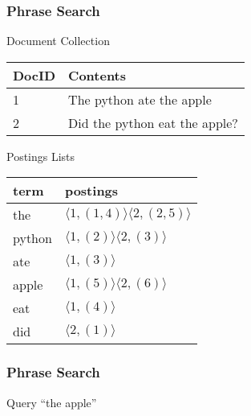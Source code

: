 \documentclass{beamer}
\begin{document}
\begin{frame}
  \frametitle{Phrase Search}

    \begin{block}{Document Collection}

    \begin{tabular}{ l | l }
      DocID & Contents \\ \hline
      1 & The python ate the apple \\
      2 & Did the python eat the apple? \\
    \end{tabular}

  \end{block}

  \begin{block}{Postings Lists}
    \begin{tabular}{ l | l }
      term & postings \\ \hline
      the & $ \langle 1,(1,4) \rangle \langle 2,(2,5) \rangle $ \\
      python & $ \langle 1,(2) \rangle \langle 2,(3) \rangle $ \\
      ate & $ \langle 1,(3) \rangle $ \\
      apple & $ \langle 1,(5) \rangle \langle 2,(6) \rangle $ \\
      eat & $ \langle 1,(4) \rangle $ \\
      did & $ \langle 2,(1) \rangle $ \\
    \end{tabular}
  \end{block}
\end{frame}

\begin{frame}
  \frametitle{Phrase Search}

  \begin{block}{Query}
    ``the apple''
  \end{block}

\end{frame}
\end{document}
